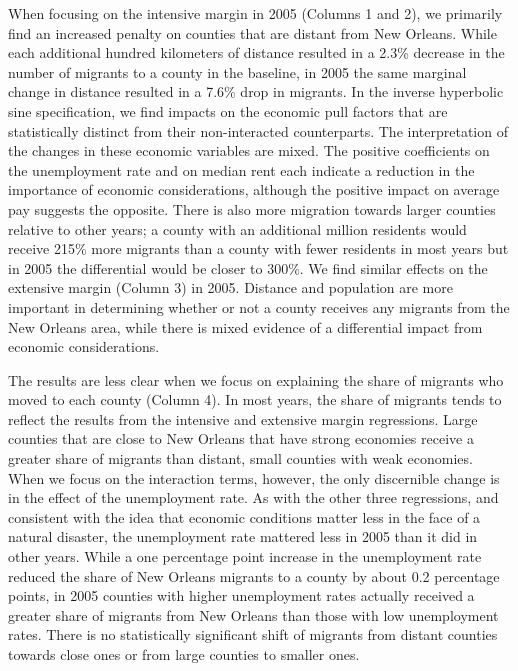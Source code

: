 \documentclass[]{article}
\begin{document}
When focusing on the intensive margin in 2005 (Columns 1 and 2), we
primarily find an increased penalty on counties that are distant from
New Orleans. While each additional hundred kilometers of distance
resulted in a 2.3\% decrease in the number of migrants to a county in
the baseline, in 2005 the same marginal change in distance resulted in a
7.6\% drop in migrants. In the inverse hyperbolic sine specification, we
find impacts on the economic pull factors that are statistically
distinct from their non-interacted counterparts. The interpretation of
the changes in these economic variables are mixed. The positive
coefficients on the unemployment rate and on median rent each indicate a
reduction in the importance of economic considerations, although the
positive impact on average pay suggests the opposite. There is also more
migration towards larger counties relative to other years; a county with
an additional million residents would receive 215\% more migrants than a
county with fewer residents in most years but in 2005 the differential
would be closer to 300\%. We find similar effects on the extensive
margin (Column 3) in 2005. Distance and population are more important in
determining whether or not a county receives any migrants from the New
Orleans area, while there is mixed evidence of a differential impact
from economic considerations.

The results are less clear when we focus on explaining the share of
migrants who moved to each county (Column 4). In most years, the share
of migrants tends to reflect the results from the intensive and
extensive margin regressions. Large counties that are close to New
Orleans that have strong economies receive a greater share of migrants
than distant, small counties with weak economies. When we focus on the
interaction terms, however, the only discernible change is in the effect
of the unemployment rate. As with the other three regressions, and
consistent with the idea that economic conditions matter less in the
face of a natural disaster, the unemployment rate mattered less in 2005
than it did in other years. While a one percentage point increase in the
unemployment rate reduced the share of New Orleans migrants to a county
by about 0.2 percentage points, in 2005 counties with higher
unemployment rates actually received a greater share of migrants from
New Orleans than those with low unemployment rates. There is no
statistically significant shift of migrants from distant counties
towards close ones or from large counties to smaller ones.
\end{document}
